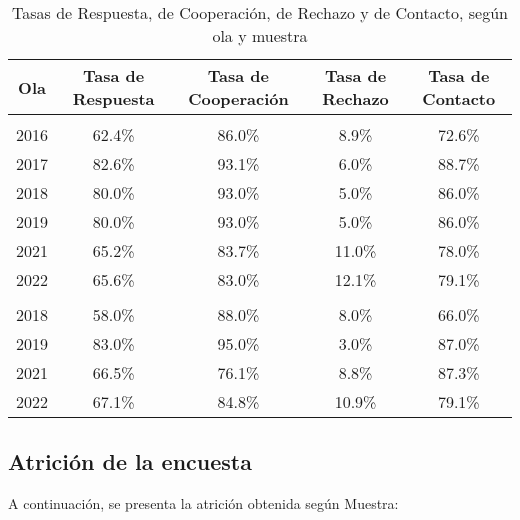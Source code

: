 \documentclass[
  12pt,
]{article}
\begin{document}
\begin{table}[H]

\caption{\label{tab:tabla-de-tasas-varias-olas}Tasas de Respuesta, de Cooperación, de Rechazo y de Contacto, según ola y muestra}
\centering
\begin{tabular}[t]{ccccc}
\toprule
Ola & Tasa de Respuesta & Tasa de Cooperación & Tasa de Rechazo & Tasa de Contacto\\
\midrule
\addlinespace[0.3em]
\multicolumn{5}{l}{\textbf{Muestra Original}}\\
\hspace{1em}2016 & 62.4\% & 86.0\% & 8.9\% & 72.6\%\\
\hspace{1em}2017 & 82.6\% & 93.1\% & 6.0\% & 88.7\%\\
\hspace{1em}2018 & 80.0\% & 93.0\% & 5.0\% & 86.0\%\\
\hspace{1em}2019 & 80.0\% & 93.0\% & 5.0\% & 86.0\%\\
\hspace{1em}2021 & 65.2\% & 83.7\% & 11.0\% & 78.0\%\\
\hspace{1em}2022 & 65.6\% & 83.0\% & 12.1\% & 79.1\%\\
\addlinespace[0.3em]
\multicolumn{5}{l}{\textbf{Muestra Refresco}}\\
\hspace{1em}2018 & 58.0\% & 88.0\% & 8.0\% & 66.0\%\\
\hspace{1em}2019 & 83.0\% & 95.0\% & 3.0\% & 87.0\%\\
\hspace{1em}2021 & 66.5\% & 76.1\% & 8.8\% & 87.3\%\\
\hspace{1em}2022 & 67.1\% & 84.8\% & 10.9\% & 79.1\%\\
\bottomrule
\end{tabular}
\end{table}

\hypertarget{atricion}{%
\subsection{Atrición de la encuesta}\label{atricion}}

A continuación, se presenta la atrición obtenida según Muestra:
\end{document}
